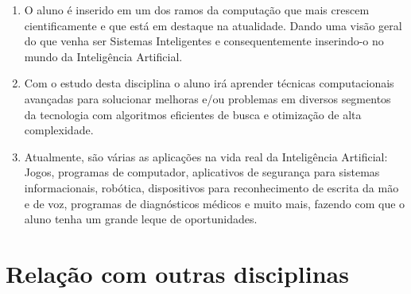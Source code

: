 \documentclass[10pt,a4paper]{article}
\begin{document}
\begin{enumerate}
\item O aluno é inserido em um dos ramos da computação que mais crescem cientificamente e que está em destaque na atualidade. Dando uma visão geral do que venha ser Sistemas Inteligentes e consequentemente inserindo-o no mundo da Inteligência Artificial.
\item Com o estudo desta disciplina o aluno irá aprender técnicas computacionais avançadas para solucionar melhoras e/ou problemas em diversos segmentos da tecnologia com algoritmos eficientes de busca e otimização de alta complexidade.
\item Atualmente, são várias as aplicações na vida real da Inteligência Artificial: Jogos, programas de computador, aplicativos de segurança para sistemas informacionais, robótica, dispositivos para reconhecimento de escrita da mão e de voz, programas de diagnósticos médicos e muito mais, fazendo com que o aluno tenha um grande leque de oportunidades.
\end{enumerate}

\section{Relação com outras disciplinas}
\end{document}
